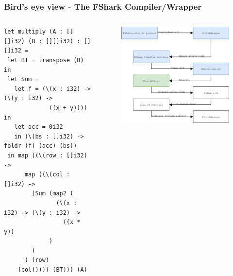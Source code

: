 \documentclass[10pt, compress]{beamer}
\begin{document}
\begin{frame}[fragile]
  \frametitle{Bird's eye view - The FShark Compiler/Wrapper}
\begin{columns}[t] %
\begin{column}{.38\textwidth}
    \begin{verbatim}
let multiply (A : [][]i32) (B : [][]i32) : [][]i32 =
 let BT = transpose (B) in
 let Sum =
   let f = (\(x : i32) -> (\(y : i32) ->
             ((x + y)))) in
   let acc = 0i32 
   in (\(bs : []i32) -> foldr (f) (acc) (bs))
 in map ((\(row : []i32) -> 
      map ((\(col : []i32) -> 
        (Sum (map2 (
               (\(x : i32) -> (\(y : i32) -> 
                 ((x * y))
             )
        )
      ) (row) 
    (col))))) (BT))) (A)
    \end{verbatim}
\end{column}
\hfill
\begin{column}{.60\textwidth}
  \begin{figure}
    \includegraphics[scale=0.7]{./images/pipeline/pipeline6}
  \end{figure}
\end{column}
\end{columns}
\end{frame}
\end{document}
